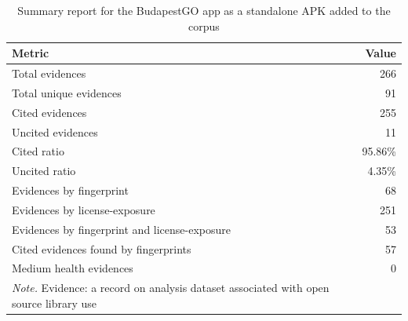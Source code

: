 \documentclass[12pt,a4paper]{report}
\begin{document}
\begin{table}[htbp]
    \centering
    \caption[Summary report for the BudapestGO app]{Summary report for the BudapestGO app as a standalone APK added to the corpus}
    \label{tab:budapestgo-summary-report}
    \begin{tabular}{lr}
    \hline
    \textbf{Metric} & \textbf{Value} \\
    \hline
    Total evidences & 266 \\
    Total unique evidences & 91 \\
    Cited evidences & 255 \\
    Uncited evidences & 11 \\
    Cited ratio & 95.86\% \\
    Uncited ratio & 4.35\% \\
    Evidences by fingerprint & 68 \\
    Evidences by license-exposure & 251 \\
    Evidences by fingerprint and license-exposure & 53 \\
    Cited evidences found by fingerprints & 57 \\
    Medium health evidences & 0 \\
    \hline
    {\footnotesize\textit{Note.} Evidence: a record on analysis dataset associated with open source library use}
    \end{tabular}
    \end{table}
\end{document}
